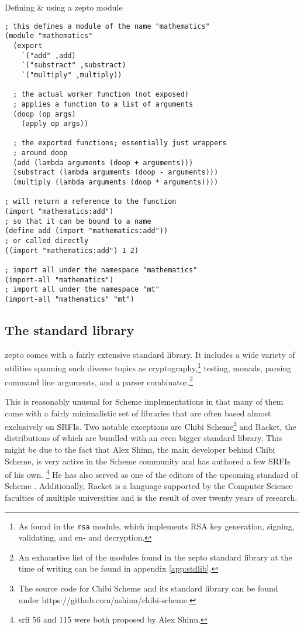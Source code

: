 \documentclass[oneside,11pt,xetex]{scrbook}
\begin{document}
\begin{listing}[H]
\caption{Defining \& using a zepto module}
\begin{verbatim}
; this defines a module of the name "mathematics"
(module "mathematics"
  (export
    `("add" ,add)
    `("substract" ,substract)
    `("multiply" ,multiply))

  ; the actual worker function (not exposed)
  ; applies a function to a list of arguments
  (doop (op args)
    (apply op args))

  ; the exported functions; essentially just wrappers
  ; around doop
  (add (lambda arguments (doop + arguments)))
  (substract (lambda arguments (doop - arguments)))
  (multiply (lambda arguments (doop * arguments))))

; will return a reference to the function
(import "mathematics:add")
; so that it can be bound to a name
(define add (import "mathematics:add"))
; or called directly
((import "mathematics:add") 1 2)

; import all under the namespace "mathematics"
(import-all "mathematics")
; import all under the namespace "mt"
(import-all "mathematics" "mt")
\end{verbatim}
\label{fig:zepmod}
\end{listing}

\subsection{The standard library}

zepto comes with a fairly extensive standard library. It includes a wide
variety of utilities spanning such diverse topics as cryptography,\footnote{As found
in the \texttt{rsa} module, which implements RSA key generation, signing,
validating, and en- and decryption.} testing, monads, parsing command line
arguments, and a parser combinator.\footnote{An exhaustive list of the modules
found in the zepto standard library at the time of writing can be found in appendix
\ref{app:stdlib}.}

This is reasonably unusual for Scheme implementations in that many of them
come with a fairly minimalistic set of libraries that are often based almost
exclusively on SRFIs. Two notable exceptions are Chibi Scheme\footnote{The source
code for Chibi Scheme and its standard library can be found under
https://github.com/ashinn/chibi-scheme.} and Racket, the distributions of which
are bundled with an even bigger standard library. This might be due to the fact
that Alex Shinn, the main developer behind Chibi Scheme, is very active in the
Scheme community and has authored a few SRFIs of his own. \footnote{\gls{srfi} 56
\parencite{SRFI56} and 115 \parencite{SRFI115} were both proposed by Alex Shinn.} He has
also served as one of the editors of the upcoming standard of Scheme \parencite{R7RS}.
Additionally, Racket is a language supported by the Computer Science faculties of
multiple universities and is the result of over twenty years of research.
\end{document}
